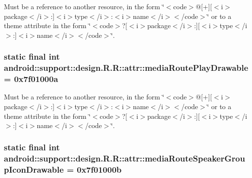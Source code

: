 Must be a reference to another resource, in the form \char`\"{}$<$code$>$@\mbox{[}+\mbox{]}\mbox{[}$<$i$>$package$<$/i$>$:\mbox{]}$<$i$>$type$<$/i$>$:$<$i$>$name$<$/i$>$$<$/code$>$\char`\"{} or to a theme attribute in the form \char`\"{}$<$code$>$?\mbox{[}$<$i$>$package$<$/i$>$:\mbox{]}\mbox{[}$<$i$>$type$<$/i$>$:\mbox{]}$<$i$>$name$<$/i$>$$<$/code$>$\char`\"{}. \hypertarget{classandroid_1_1support_1_1design_1_1_r_1_1attr_2d19843acac893d46124040685e6757a}{
\subsubsection[{mediaRoutePlayDrawable}]{\setlength{\rightskip}{0pt plus 5cm}static final int android::support::design.R.R::attr::mediaRoutePlayDrawable = 0x7f01000a}}
\label{classandroid_1_1support_1_1design_1_1_r_1_1attr_2d19843acac893d46124040685e6757a}


Must be a reference to another resource, in the form \char`\"{}$<$code$>$@\mbox{[}+\mbox{]}\mbox{[}$<$i$>$package$<$/i$>$:\mbox{]}$<$i$>$type$<$/i$>$:$<$i$>$name$<$/i$>$$<$/code$>$\char`\"{} or to a theme attribute in the form \char`\"{}$<$code$>$?\mbox{[}$<$i$>$package$<$/i$>$:\mbox{]}\mbox{[}$<$i$>$type$<$/i$>$:\mbox{]}$<$i$>$name$<$/i$>$$<$/code$>$\char`\"{}. \hypertarget{classandroid_1_1support_1_1design_1_1_r_1_1attr_2797b802386b58f3d78ec9cab25dee85}{
\subsubsection[{mediaRouteSpeakerGroupIconDrawable}]{\setlength{\rightskip}{0pt plus 5cm}static final int android::support::design.R.R::attr::mediaRouteSpeakerGroupIconDrawable = 0x7f01000b}}
\label{classandroid_1_1support_1_1design_1_1_r_1_1attr_2797b802386b58f3d78ec9cab25dee85}


